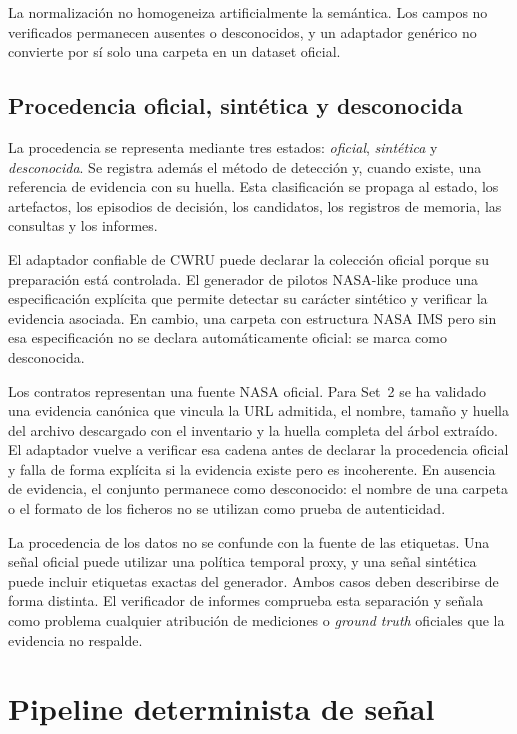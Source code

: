 La normalización no homogeneiza artificialmente la semántica. Los campos no
verificados permanecen ausentes o desconocidos, y un adaptador genérico no
convierte por sí solo una carpeta en un dataset oficial.

\subsection{Procedencia oficial, sintética y desconocida}

La procedencia se representa mediante tres estados: \emph{oficial},
\emph{sintética} y \emph{desconocida}. Se registra además el método de
detección y, cuando existe, una referencia de evidencia con su huella. Esta
clasificación se propaga al estado, los artefactos, los episodios de decisión,
los candidatos, los registros de memoria, las consultas y los informes.

El adaptador confiable de CWRU puede declarar la colección oficial porque su
preparación está controlada. El generador de pilotos NASA-like produce una
especificación explícita que permite detectar su carácter sintético y verificar
la evidencia asociada. En cambio, una carpeta con estructura NASA IMS pero sin
esa especificación no se declara automáticamente oficial: se marca como
desconocida.

Los contratos representan una fuente NASA oficial. Para Set~2 se ha
validado una evidencia canónica que vincula la URL admitida, el nombre, tamaño
y huella del archivo descargado con el inventario y la huella completa del
árbol extraído. El adaptador vuelve a verificar esa cadena antes de declarar la
procedencia oficial y falla de forma explícita si la evidencia existe pero es
incoherente. En ausencia de evidencia, el conjunto permanece como desconocido:
el nombre de una carpeta o el formato de los ficheros no se utilizan como prueba
de autenticidad.

La procedencia de los datos no se confunde con la fuente de las etiquetas. Una
señal oficial puede utilizar una política temporal proxy, y una señal sintética
puede incluir etiquetas exactas del generador. Ambos casos deben describirse de
forma distinta. El verificador de informes comprueba esta separación y señala
como problema cualquier atribución de mediciones o \textit{ground truth}
oficiales que la evidencia no respalde.

\section{Pipeline determinista de señal}

